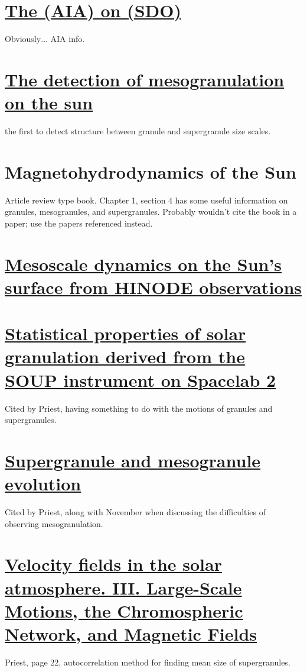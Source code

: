 \documentclass{article}
\begin{document}
\section{%
\href{http://cdsads.u-strasbg.fr/abs/2012SoPh..275...17L}
{The (AIA) on (SDO)}}
Obviously$\ldots$ AIA info.

\section{%
\href{http://adsabs.harvard.edu/abs/1981ApJ...245L.123N}
{The detection of mesogranulation on the sun}}
the first to detect structure between granule
and supergranule size scales.

\section{%
Magnetohydrodynamics of the Sun}
Article review type book. Chapter 1, section 4 has some useful
information on granules, mesogranules, and supergranules.
Probably wouldn't cite the book in a paper; use the papers referenced
instead.

\section{%
\href{http://adsabs.harvard.edu/cgi-bin/bib_query?arXiv:0902.2299}
{Mesoscale dynamics on the Sun's surface from HINODE
observations}}

\section{%
\href{http://cdsads.u-strasbg.fr/abs/1989ApJ...336..475T}
{Statistical properties of solar granulation derived
from the SOUP instrument on Spacelab 2}}
Cited by Priest, having something to do with
the motions of granules and supergranules.

\section{%
\href{http://cdsads.u-strasbg.fr/abs/2000SoPh..193..313S}
{Supergranule and mesogranule evolution}}
Cited by Priest, along with November when
discussing the difficulties of observing mesogranulation.

\section{%
\href{http://cdsads.u-strasbg.fr/abs/1964ApJ...140.1120S}
{Velocity fields in the solar atmosphere. III.
Large-Scale Motions, the Chromospheric Network, and Magnetic Fields}}
Priest, page 22, autocorrelation method for finding mean size of
supergranules.
\end{document}
